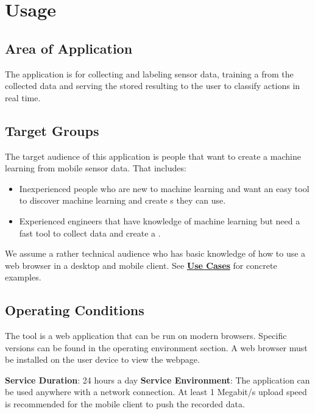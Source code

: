 \section{Usage}
\subsection{Area of Application}
The application is for collecting and labeling \gls{sensor} data, training a  from the collected data and serving the stored resulting  to the user to classify actions in real time.

\subsection{Target Groups}
The target audience of this application is people that want to create a machine learning  from mobile \gls{sensor} data. That includes:
\begin{itemize}
    \item Inexperienced people who are new to machine learning and want an easy tool to discover machine learning and create s they can use.
    \item Experienced engineers that have knowledge of machine learning but need a fast tool to collect data and create a .
\end{itemize}
We assume a rather technical audience who has basic knowledge of how to use a web browser in a desktop and mobile client. See \hyperref[Use Cases]{\textbf{Use Cases}} for concrete examples.

\subsection{Operating Conditions}
The tool is a web application that can be run on modern browsers. Specific versions can be found in the operating environment section. A web browser must be installed on the user device to view the webpage.

\textbf{Service Duration}: 24 hours a day
\newline
\newline
\textbf{Service Environment}: The application can be used anywhere with a network connection. At least 1 Megabit/s upload speed is recommended for the mobile client to push the recorded data.